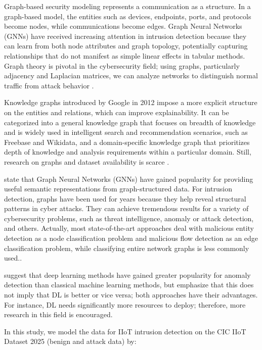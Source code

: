 \documentclass[final,5p,times,twocolumn]{elsarticle}
\begin{document}
Graph-based security modeling represents a communication as a structure. In a graph-based model, the entities such as devices, endpoints, ports, and protocols become nodes, while communications become edges. Graph Neural Networks (GNNs) have received increasing attention in intrusion detection because they can learn from both node attributes and graph topology, potentially capturing relationships that do not manifest as simple linear effects in tabular methods. Graph theory is pivotal in the cybersecurity field; using graphs, particularly adjacency and Laplacian matrices, we can analyze networks to distinguish normal traffic from attack behavior \citep{zhong2024survey,bilot2023graph,jaber_spectral_2025}.

Knowledge graphs introduced by Google in 2012 impose a more explicit structure on the entities and relations, which can improve explainability. It can be categorized into a general knowledge graph that focuses on breadth of knowledge and is widely used in intelligent search and recommendation scenarios, such as Freebase and Wikidata, and a domain-specific knowledge graph that prioritizes depth of knowledge and analysis requirements within a particular domain. Still, research on graphs and dataset availability is scarce \citep{li2024cybersecurity}.

\cite{bilot2023graph} state that Graph Neural Networks (GNNs) have gained popularity for providing useful semantic representations from graph-structured data. For intrusion detection, graphs have been used for years because they help reveal structural patterns in cyber attacks. They can achieve tremendous results for a variety of cybersecurity problems, such as threat intelligence, anomaly or attack detection, and others. Actually, most state-of-the-art approaches deal with malicious entity detection as a node classification problem and malicious flow detection as an edge classification problem, while classifying entire network graphs is less commonly used.\citep{bilot2023graph}.

\cite{gokstorp_machine_2026} suggest that deep learning methods have gained greater popularity for anomaly detection than classical machine learning methods, but emphasize that this does not imply that DL is better or vice versa; both approaches have their advantages. For instance, DL needs significantly more resources to deploy; therefore, more research in this field is encouraged.

In this study, we model the data for IIoT intrusion detection on the CIC IIoT Dataset 2025 (benign and attack data) by:
\end{document}
